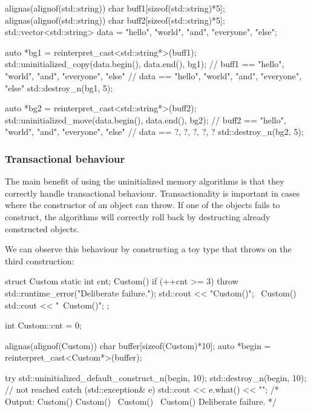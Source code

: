 \begin{box-note}
\begin{cppcode}
alignas(alignof(std::string)) char buff1[sizeof(std::string)*5];
alignas(alignof(std::string)) char buff2[sizeof(std::string)*5];
std::vector<std::string> data = {"hello", "world", "and", "everyone", "else"};

auto *bg1 = reinterpret_cast<std::string*>(buff1);
std::uninitialized_copy(data.begin(), data.end(), bg1);
// buff1 == { "hello", "world", "and", "everyone", "else"}
// data == { "hello", "world", "and", "everyone", "else"}
std::destroy_n(bg1, 5);

auto *bg2 = reinterpret_cast<std::string*>(buff2);
std::uninitialized_move(data.begin(), data.end(), bg2); 
// buff2 == { "hello", "world", "and", "everyone", "else"}
// data == { ?, ?, ?, ?, ?}
std::destroy_n(bg2, 5);
\end{cppcode}
\end{box-note}

\subsubsection{Transactional behaviour}

The main benefit of using the uninitialized memory algorithms is that they correctly handle transactional behaviour. Transactionality is important in cases where the constructor of an object can throw. If one of the objects fails to construct, the algorithms will correctly roll back by destructing already constructed objects.

We can observe this behaviour by constructing a toy type that throws on the third construction:

\begin{box-note}
\begin{cppcode}
struct Custom {
  static int cnt;
  Custom() { 
    if (++cnt >= 3)
      throw std::runtime_error("Deliberate failure."); 
    std::cout << "Custom()\n";
  }
  ~Custom() {
    std::cout << "~Custom()\n";
  }
};

int Custom::cnt = 0;

alignas(alignof(Custom)) char buffer[sizeof(Custom)*10];
auto *begin = reinterpret_cast<Custom*>(buffer);

try {
  std::uninitialized_default_construct_n(begin, 10);
  std::destroy_n(begin, 10); // not reached
} catch (std::exception& e) {
  std::cout << e.what() << "\n";
}
/* Output:
Custom()
Custom()
~Custom()
~Custom()
Deliberate failure.
*/
\end{cppcode}
\end{box-note}

